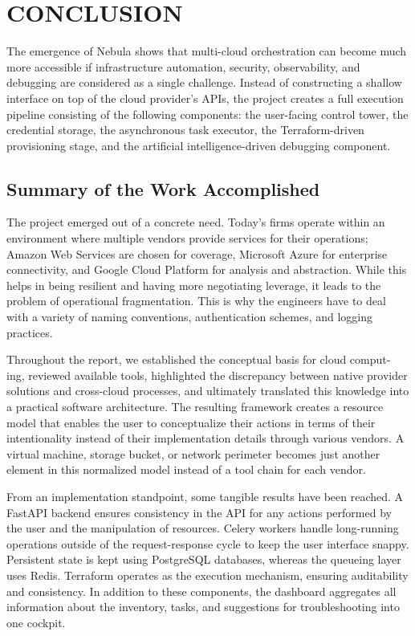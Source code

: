 \chapter{CONCLUSION}

The emergence of Nebula shows that multi-cloud orchestration can become much more accessible if infrastructure automation, security, observability, and debugging are considered as a single challenge. Instead of constructing a shallow interface on top of the cloud provider’s APIs, the project creates a full execution pipeline consisting of the following components: the user-facing control tower, the credential storage, the asynchronous task executor, the Terraform-driven provisioning stage, and the artificial intelligence-driven debugging component.

\section{Summary of the Work Accomplished}
The project emerged out of a concrete need. Today’s firms operate within an environment where multiple vendors provide services for their operations; Amazon Web Services are chosen for coverage, Microsoft Azure for enterprise connectivity, and Google Cloud Platform for analysis and abstraction. While this helps in being resilient and having more negotiating leverage, it leads to the problem of operational fragmentation. This is why the engineers have to deal with a variety of naming conventions, authentication schemes, and logging practices.


Throughout the report, we established the conceptual basis for cloud comput- ing, reviewed available tools, highlighted the discrepancy between native provider solutions and cross-cloud processes, and ultimately translated this knowledge into a practical software architecture. The resulting framework creates a resource model that enables the user to conceptualize their actions in terms of their intentionality instead of their implementation details through various vendors. A virtual machine, storage bucket, or network perimeter becomes just another element in this normalized model instead of a tool chain for each vendor.

From an implementation standpoint, some tangible results have been reached. A FastAPI backend ensures consistency in the API for any actions performed by the user and the manipulation of resources. Celery workers handle long-running operations outside of the request-response cycle to keep the user interface snappy. Persistent state is kept using PostgreSQL databases, whereas the queueing layer uses Redis. Terraform operates as the execution mechanism, ensuring auditability and consistency. In addition to these components, the dashboard aggregates all information about the inventory, tasks, and suggestions for troubleshooting into one cockpit.


